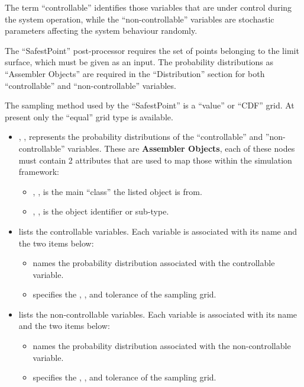 The term ``controllable'' identifies those variables that are under control
during the system operation, while the ``non-controllable'' variables are
stochastic parameters affecting the system behaviour randomly.

The ``SafestPoint'' post-processor requires the set of points belonging to the
limit surface, which must be given as an input.
%
The probability distributions as ``Assembler Objects'' are required in the
``Distribution'' section for both ``controllable'' and ``non-controllable''
variables.

The sampling method used by the ``SafestPoint'' is a ``value'' or ``CDF'' grid.
%
At present only the ``equal'' grid type is available.


\begin{itemize}
  \item {}, , represents the probability
  distributions of the ``controllable'' and ''non-controllable'' variables.
  These are \textbf{Assembler Objects}, each of these nodes must contain 2
  attributes that are used to map those within the simulation framework:
	\begin{itemize}
    \item {}, , is the main
    ``class'' the listed object is from.
 		\item {}, , is the object
    identifier or sub-type.
	\end{itemize}
	\item {} lists the controllable variables.
  Each variable is associated with its name and the two items below:
	\begin{itemize}
		\item {} names the probability distribution associated
    with the controllable variable.
		\item {} specifies the , , and
    tolerance of the sampling grid.
	\end{itemize}
	\item {} lists the non-controllable variables.
  Each variable is associated with its name and the two items below:
	\begin{itemize}
		\item {} names the probability distribution associated
    with the non-controllable variable.
		\item {} specifies the , , and
    tolerance of the sampling grid.
		\end{itemize}
\end{itemize}

